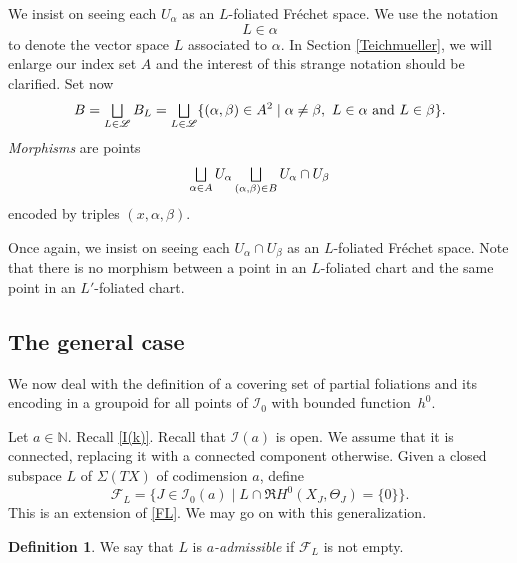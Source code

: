 \documentclass[JEP,XML,SOM,Unicode]{cedram}
\let\mathcal\mathscr
\let\oldbigsqcup\bigsqcup
\renewcommand{\bigsqcup}{\mathop{\textstyle\oldbigsqcup}\displaylimits}
\theoremstyle{plain}
\theoremstyle{definition}
\newtheorem{definition}[theorem]{Definition}
\theoremstyle{remark}
\numberwithin{equation}{section}
\newcommand{\cI}{\mathcal{I}}
\let\uniondisjointe\bigsqcup
\begin{document}
We insist on seeing each $U_{\alpha}$ as an $L$-foliated Fréchet space. We use the notation
\begin{equation}
\label{Lalpha}
L\in\alpha
\end{equation}
to denote the vector space $L$ associated to $\alpha$. In Section \ref{Teichmueller}, we will enlarge our index set $A$ and the interest of this strange notation should be clarified. Set now
\begin{equation}
\label{B}
B=\uniondisjointe_{L\in\mathcal L} B_L=\uniondisjointe_{L\in\mathcal L}\{(\alpha,\beta)\in A^2\mid \alpha\not = \beta,\ L\in\alpha\text{ and }L\in\beta\}.
\end{equation}
\emph{Morphisms} are
points
\begin{equation}
\label{morphisms}
\uniondisjointe_{\alpha\in A}U_\alpha\uniondisjointe _{(\alpha,\beta)\in B} U_{\alpha}\cap U_{\beta}
\end{equation}
encoded by triples $(x,\alpha,\beta)$.

Once again, we insist on seeing each $U_{\alpha}\cap U_{\beta}$ as an $L$-foliated Fréchet space. Note that there is no morphism between a point in an $L$-foliated chart and the same point in an $L'$-foliated chart.

\subsection{The general case}
\label{multifoliategeneral}
We now deal with the definition of a covering set of partial foliations and its encoding in a groupoid for all points of $\cI_0$ with bounded function~$h^0$.

Let $a\in\mathbb N$. Recall \eqref{I(k)}. Recall that $\cI(a)$ is open. We assume that it is connected, replacing it with a connected component otherwise. Given a closed subspace $L$ of $\Sigma(TX)$ of codimension $a$, define
\begin{equation}
\label{FLbis}
\mathcal F_L=\{J\in\cI_0(a)\mid L\cap\Re H^0(X_J,\Theta_J)=\{0\}\}.
\end{equation}
This is an extension of \eqref{FL}. We may go on with this generalization.

\begin{definition}
We say that $L$ is \emph{$a$-admissible} if $\mathcal F_L$ is not empty.
\end{definition}
\end{document}
